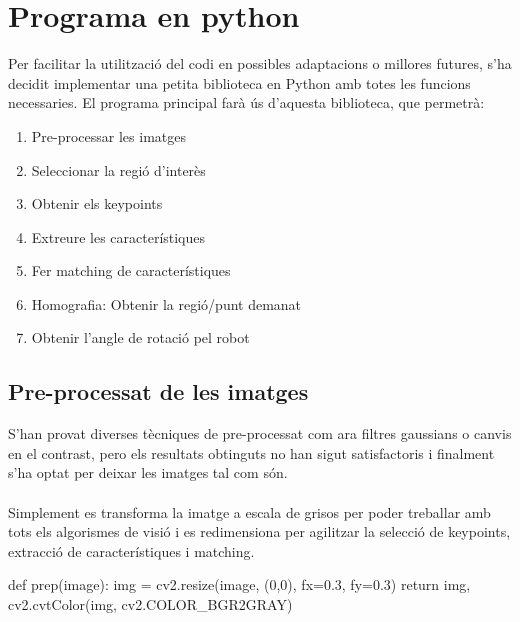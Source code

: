 \section{Programa en python}
	Per facilitar la utilització del codi en possibles adaptacions o millores futures, s'ha decidit implementar una petita biblioteca en Python amb totes les funcions necessaries. El programa principal farà ús
	d'aquesta biblioteca, que permetrà:

	\begin{enumerate}
		\item{Pre-processar les imatges}
		\item{Seleccionar la regió d'interès}
		\item{Obtenir els keypoints}
		\item{Extreure les característiques}
		\item{Fer matching de característiques}
		\item{Homografia: Obtenir la regió/punt demanat}
		\item{Obtenir l'angle de rotació pel robot}
	\end{enumerate}

	\subsection{Pre-processat de les imatges}
		S'han provat diverses tècniques de pre-processat com ara filtres gaussians o canvis en el contrast, pero els resultats obtinguts no han sigut satisfactoris i finalment s'ha optat per deixar
		les imatges tal com són.\\\\
		Simplement es transforma la imatge a escala de grisos per poder treballar amb tots els algorismes de visió i es redimensiona per agilitzar la selecció de keypoints, extracció
		de característiques i matching.\\
		\begin{python}
def prep(image):
	img = cv2.resize(image, (0,0), fx=0.3, fy=0.3)
	return img, cv2.cvtColor(img, cv2.COLOR_BGR2GRAY)
		\end{python}

